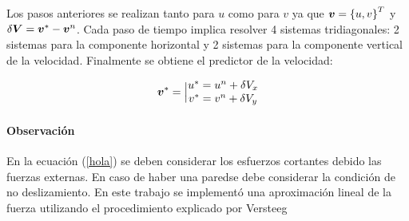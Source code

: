 Los pasos anteriores se realizan tanto para $u$ como para $v$ ya que $\boldsymbol{v}=\left\{ u,v \right\}^T$ y $\delta \boldsymbol{V} = \boldsymbol{v}^* - \boldsymbol{v}^n $. Cada paso de tiempo implica resolver 4 sistemas tridiagonales: 2 sistemas para la componente horizontal y 2 sistemas para la componente vertical de la velocidad. Finalmente se obtiene el predictor de la velocidad:

\begin{equation}
\boldsymbol{v}^* = \Big| \begin{matrix} u^* = u^n + \delta V_x \\ v^* = v^n + \delta V_y
\end{matrix}
\end{equation}

\paragraph{Observación} En la ecuación (\ref{hola}) se deben considerar los esfuerzos cortantes debido las fuerzas externas. En caso de haber una paredse debe considerar la condición de no deslizamiento. En este trabajo se implementó una aproximación lineal de la fuerza utilizando el procedimiento explicado por Versteeg \cite{versteeg}   